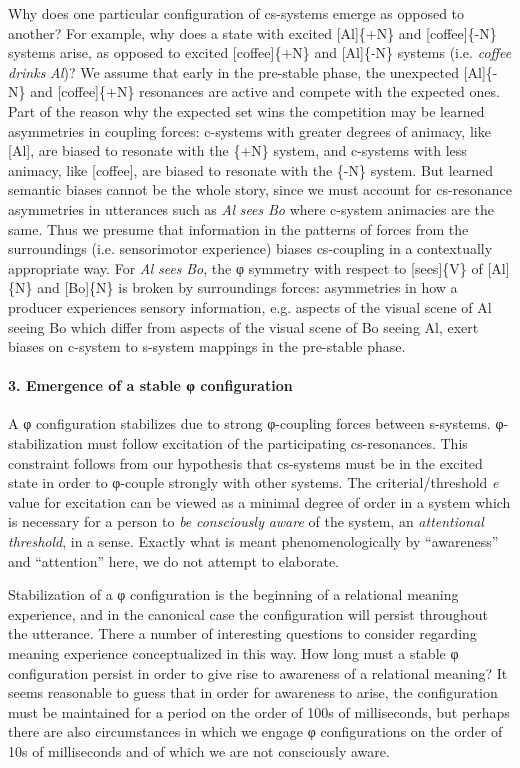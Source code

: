   Why does one particular configuration of cs-systems emerge as opposed to another? For example, why does a state with excited [Al]\{+N\} and [coffee]\{-N\} systems arise, as opposed to excited [coffee]\{+N\} and [Al]\{-N\} systems (i.e. \textit{coffee} \textit{drinks} \textit{Al})? We assume that early in the pre-stable phase, the unexpected [Al]\{-N\} and [coffee]\{+N\} resonances are active and compete with the expected ones. Part of the reason why the expected set wins the competition may be learned asymmetries in coupling forces: c-systems with greater degrees of animacy, like [Al], are biased to resonate with the \{+N\} system, and c-systems with less animacy, like [coffee], are biased to resonate with the \{-N\} system. But learned semantic biases cannot be the whole story, since we must account for cs-resonance asymmetries in utterances such as \textit{Al} \textit{sees} \textit{Bo} where c-system animacies are the same. Thus we presume that information in the patterns of forces from the surroundings (i.e. sensorimotor experience) biases cs-coupling in a contextually appropriate way. For \textit{Al} \textit{sees} \textit{Bo}, the φ symmetry with respect to [sees]\{V\} of [Al]\{N\} and [Bo]\{N\} is broken by surroundings forces: asymmetries in how a producer experiences sensory information, e.g. aspects of the visual scene of Al seeing Bo which differ from aspects of the visual scene of Bo seeing Al, exert biases on c-system to s-system mappings in the pre-stable phase.

\paragraph{3. Emergence of a stable φ configuration}

A φ configuration stabilizes due to strong φ{}-coupling forces between s-systems. φ{}-stabilization must follow excitation of the participating cs-resonances. This constraint follows from our hypothesis that cs-systems must be in the excited state in order to φ-couple strongly with other systems. The criterial/threshold \textit{e} value for excitation can be viewed as a minimal degree of order in a system which is necessary for a person to \textit{be} \textit{consciously} \textit{aware} of the system, an \textit{attentional} \textit{threshold}, in a sense. Exactly what is meant phenomenologically by “awareness” and “attention” here, we do not attempt to elaborate. 

   Stabilization of a φ configuration is the beginning of a relational meaning experience, and in the canonical case the configuration will persist throughout the utterance. There a number of interesting questions to consider regarding meaning experience conceptualized in this way. How long must a stable φ configuration persist in order to give rise to awareness of a relational meaning? It seems reasonable to guess that in order for awareness to arise, the configuration must be maintained for a period on the order of 100s of milliseconds, but perhaps there are also circumstances in which we engage φ configurations on the order of 10s of milliseconds and of which we are not consciously aware.

